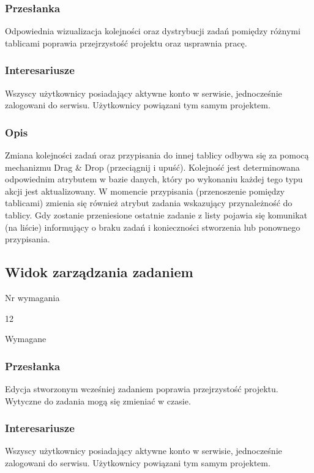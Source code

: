 \documentclass[eng,printmode]{mgr}
\begin{document}
\subsubsection{Przesłanka}
Odpowiednia wizualizacja kolejności oraz dystrybucji zadań pomiędzy różnymi tablicami poprawia przejrzystość projektu oraz usprawnia pracę.

\subsubsection{Interesariusze}
Wszyscy użytkownicy posiadający aktywne konto w serwisie, jednocześnie zalogowani do serwisu. Użytkownicy powiązani tym samym projektem.

\subsubsection{Opis}
Zmiana kolejności zadań oraz przypisania do innej tablicy odbywa się za pomocą mechanizmu Drag \& Drop (przeciągnij i upuść). Kolejność jest determinowana odpowiednim atrybutem w bazie danych, który po wykonaniu każdej tego typu akcji jest aktualizowany. W momencie przypisania (przenoszenie pomiędzy tablicami) zmienia się również atrybut zadania wskazujący przynależność do tablicy. Gdy zostanie przeniesione ostatnie zadanie z listy pojawia się komunikat (na liście) informujący o braku zadań i konieczności stworzenia lub ponownego przypisania.

\subsection{Widok zarządzania zadaniem}
\begin{labeling}{Nr wymagania}
\item [Nr wymagania:] 12
\item [Priorytet:] Wymagane
\end{labeling}
\subsubsection{Przesłanka}
Edycja stworzonym wcześniej zadaniem poprawia przejrzystość projektu. Wytyczne do zadania mogą się zmieniać w czasie.

\subsubsection{Interesariusze}
Wszyscy użytkownicy posiadający aktywne konto w serwisie, jednocześnie zalogowani do serwisu. Użytkownicy powiązani tym samym projektem.
\end{document}
